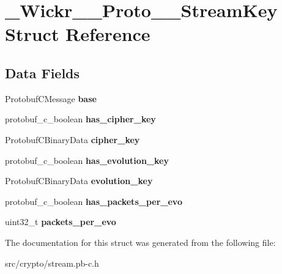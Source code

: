 \hypertarget{struct___wickr_____proto_____stream_key}{}\section{\+\_\+\+Wickr\+\_\+\+\_\+\+Proto\+\_\+\+\_\+\+Stream\+Key Struct Reference}
\label{struct___wickr_____proto_____stream_key}
\subsection*{Data Fields}
\begin{DoxyCompactItemize}
\item 
\mbox{\label{struct___wickr_____proto_____stream_key_a22e6f5341e7c353f8124605e06f3f07d}} 
Protobuf\+C\+Message {\bfseries base}
\item 
\mbox{\label{struct___wickr_____proto_____stream_key_a66247b20aee875c60af78c9a7e4e513e}} 
protobuf\+\_\+c\+\_\+boolean {\bfseries has\+\_\+cipher\+\_\+key}
\item 
\mbox{\label{struct___wickr_____proto_____stream_key_a10ab062c24f8eec72d27521b83e9211b}} 
Protobuf\+C\+Binary\+Data {\bfseries cipher\+\_\+key}
\item 
\mbox{\label{struct___wickr_____proto_____stream_key_abaa75e813d5e60a698e72bce490f7174}} 
protobuf\+\_\+c\+\_\+boolean {\bfseries has\+\_\+evolution\+\_\+key}
\item 
\mbox{\label{struct___wickr_____proto_____stream_key_ab08ca5b563521d8b3c4ce046ba8e7aaa}} 
Protobuf\+C\+Binary\+Data {\bfseries evolution\+\_\+key}
\item 
\mbox{\label{struct___wickr_____proto_____stream_key_aa98ffb7650c02c8e1fbeb2f133a804be}} 
protobuf\+\_\+c\+\_\+boolean {\bfseries has\+\_\+packets\+\_\+per\+\_\+evo}
\item 
\mbox{\label{struct___wickr_____proto_____stream_key_a45e88c0764d286c6186267316147bb5c}} 
uint32\+\_\+t {\bfseries packets\+\_\+per\+\_\+evo}
\end{DoxyCompactItemize}


The documentation for this struct was generated from the following file\+:\begin{DoxyCompactItemize}
\item 
src/crypto/stream.\+pb-\/c.\+h\end{DoxyCompactItemize}
